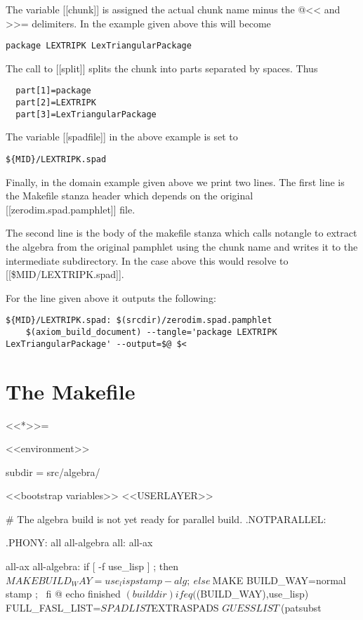 \documentclass{article}
\begin{document}
The variable [[chunk]] is assigned the actual chunk name minus
the @<< and >>= delimiters. In the example given above this will become
\begin{verbatim}
package LEXTRIPK LexTriangularPackage
\end{verbatim}
The call to [[split]] splits the chunk into parts separated
by spaces. Thus
\begin{verbatim}
  part[1]=package
  part[2]=LEXTRIPK
  part[3]=LexTriangularPackage
\end{verbatim}
The variable [[spadfile]] in the above example is set to
\begin{verbatim}
${MID}/LEXTRIPK.spad
\end{verbatim}
Finally, in the domain example given above we print two lines.
The first line is the Makefile stanza header which depends on the
original [[zerodim.spad.pamphlet]] file.

The second line is the body of the makefile stanza which calls 
notangle to extract the algebra from the original pamphlet using
the chunk name and writes it to the intermediate subdirectory. In
the case above this would resolve to [[\${MID}/LEXTRIPK.spad]].

For the line given above it outputs the following:
\begin{verbatim}
${MID}/LEXTRIPK.spad: $(srcdir)/zerodim.spad.pamphlet
	$(axiom_build_document) --tangle='package LEXTRIPK LexTriangularPackage' --output=$@ $<
\end{verbatim}


\section{The Makefile}

<<*>>=

<<environment>>

subdir = src/algebra/


<<bootstrap variables>>
<<USERLAYER>>

# The algebra build is not yet ready for parallel build.
.NOTPARALLEL:

.PHONY: all all-algebra
all: all-ax

all-ax all-algebra:
	if [ -f use_lisp ] ; then \
          ${MAKE} BUILD_WAY=use_lisp stamp-alg ; \
	else \
	  ${MAKE} BUILD_WAY=normal stamp ; \
	fi
	@ echo finished $(builddir)

ifeq ($(BUILD_WAY),use_lisp)
FULL_FASL_LIST=${SPADLIST} ${EXTRASPADS} ${GUESSLIST} \
               $(patsubst %
\end{document}
